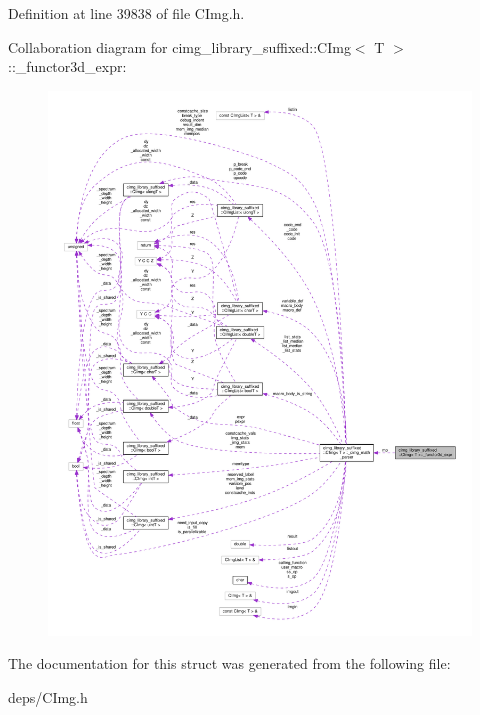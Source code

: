 Definition at line 39838 of file C\+Img.\+h.



Collaboration diagram for cimg\+\_\+library\+\_\+suffixed\+:\+:C\+Img$<$ T $>$\+:\+:\+\_\+functor3d\+\_\+expr\+:
\nopagebreak
\begin{figure}[H]
\begin{center}
\leavevmode
\includegraphics[width=350pt]{dd/d8d/structcimg__library__suffixed_1_1CImg_1_1__functor3d__expr__coll__graph}
\end{center}
\end{figure}


The documentation for this struct was generated from the following file\+:\begin{DoxyCompactItemize}
\item 
deps/C\+Img.\+h\end{DoxyCompactItemize}
